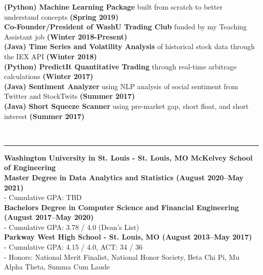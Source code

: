 \documentclass[11pt]{article}
\begin{document}
\begin{titlepage}
\begin{addmargin}[1em]{0em}
			\textbf{(Python) Machine Learning Package} built from scratch to better understand concepts \textbf{ \hfill (Spring 2019)}\\
			\textbf{Co-Founder/President of WashU Trading Club} funded by my Teaching Assistant job \textbf{\hfill (Winter 2018-Present)}\\
			\textbf{(Java) Time Series and Volatility Analysis} of historical stock data through the IEX API \textbf{\hfill (Winter 2018)}\\
			\textbf{(Python) PredictIt Quantitative Trading} through real-time arbitrage calculations \textbf{\hfill (Winter 2017)}\\
            \textbf{(Java) Sentiment Analyzer} using NLP analysis of social sentiment from Twitter and StockTwits \textbf{\hfill (Summer 2017)}\\	
			\textbf{(Java) Short Squeeze Scanner} using pre-market gap, short float, and short interest \textbf{\hfill (Summer 2017)}\\
		\end{addmargin}
		\vspace{-10pt}
		\noindent
		\\\rule{\textwidth}{0.4pt}
		\begin{addmargin}[1em]{0em}
			\textbf{Washington University in St. Louis - St. Louis, MO \hfill McKelvey School of Engineering}\\
			\textbf{Master  Degree in Data Analytics and Statistics \hfill (August 2020–May 2021)}\\
			- Cumulative GPA: TBD\\
			\textbf{Bachelors Degree in Computer Science and Financial Engineering \hfill (August 2017–May 2020)}\\
			- Cumulative GPA: 3.78 / 4.0 (Dean's List)\\
			\textbf{Parkway West High School - St. Louis, MO \hfill (August 2013–May 2017)}\\
- Cumulative GPA: 4.15 / 4.0, ACT: 34 / 36\\
- Honors: National Merit Finalist, National Honor Society, Beta Chi Pi, Mu Alpha Theta, Summa Cum Laude \\
		\end{addmargin}
	\end{titlepage}
\end{document}
